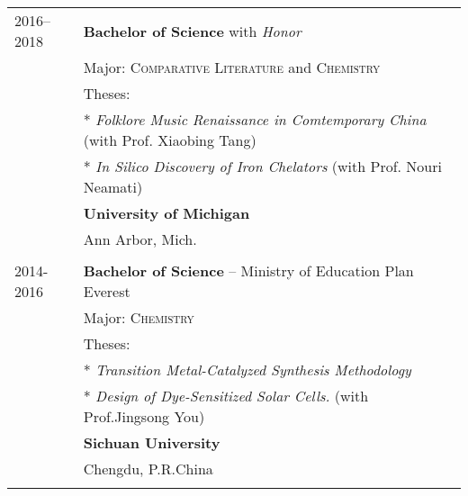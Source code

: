 \documentclass[letterpaper,10pt]{article}
\begin{document}
\begin{longtable}{p{} p{} }
 \textsc{2016--2018}  & \textbf{Bachelor of Science} with \textit{Honor}\\& Major:  \textsc{Comparative Literature} and \textsc{Chemistry}  \\
 & Theses: \\
 & * \textit{Folklore Music Renaissance in Comtemporary China} (with Prof. Xiaobing Tang)\\
 & * \textit{In Silico Discovery of Iron Chelators} (with Prof. Nouri Neamati) \\
 & \textbf{University of Michigan}\\
 & Ann Arbor, Mich.
\\&\\
2014-2016& \textbf{Bachelor of Science} -- Ministry of Education Plan Everest\\
& Major: \textsc{Chemistry}\\
& Theses: \\
& * \textit{Transition Metal-Catalyzed Synthesis Methodology} \\
& * \textit{Design of Dye-Sensitized Solar Cells.} (with Prof.Jingsong You) \\
&\normalsize\textbf{Sichuan University} \\
& Chengdu, P.R.China\\&\\

\end{longtable}
\end{document}
